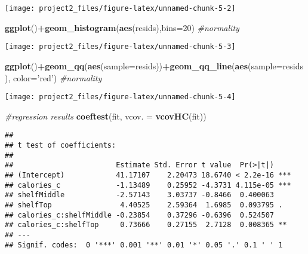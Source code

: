 \documentclass[]{article}
\newenvironment{Shaded}{\begin{snugshade}}{\end{snugshade}}
\newcommand{\CommentTok}[1]{\textcolor[rgb]{0.56,0.35,0.01}{\textit{#1}}}
\newcommand{\DataTypeTok}[1]{\textcolor[rgb]{0.13,0.29,0.53}{#1}}
\newcommand{\DecValTok}[1]{\textcolor[rgb]{0.00,0.00,0.81}{#1}}
\newcommand{\KeywordTok}[1]{\textcolor[rgb]{0.13,0.29,0.53}{\textbf{#1}}}
\newcommand{\NormalTok}[1]{#1}
\newcommand{\OperatorTok}[1]{\textcolor[rgb]{0.81,0.36,0.00}{\textbf{#1}}}
\newcommand{\StringTok}[1]{\textcolor[rgb]{0.31,0.60,0.02}{#1}}
\begin{document}
\begin{center}\texttt{[image: project2\_files/figure-latex/unnamed-chunk-5-2]} \end{center}

\begin{Shaded}
\begin{Highlighting}[]
\KeywordTok{ggplot}\NormalTok{()}\OperatorTok{+}\KeywordTok{geom_histogram}\NormalTok{(}\KeywordTok{aes}\NormalTok{(resids),}\DataTypeTok{bins=}\DecValTok{20}\NormalTok{) }\CommentTok{#normality}
\end{Highlighting}
\end{Shaded}

\begin{center}\texttt{[image: project2\_files/figure-latex/unnamed-chunk-5-3]} \end{center}

\begin{Shaded}
\begin{Highlighting}[]
\KeywordTok{ggplot}\NormalTok{()}\OperatorTok{+}\KeywordTok{geom_qq}\NormalTok{(}\KeywordTok{aes}\NormalTok{(}\DataTypeTok{sample=}\NormalTok{resids))}\OperatorTok{+}\KeywordTok{geom_qq_line}\NormalTok{(}\KeywordTok{aes}\NormalTok{(}\DataTypeTok{sample=}\NormalTok{resids), }\DataTypeTok{color=}\StringTok{'red'}\NormalTok{) }\CommentTok{#normality}
\end{Highlighting}
\end{Shaded}

\begin{center}\texttt{[image: project2\_files/figure-latex/unnamed-chunk-5-4]} \end{center}

\begin{Shaded}
\begin{Highlighting}[]
\CommentTok{#regression results}
\KeywordTok{coeftest}\NormalTok{(fit, }\DataTypeTok{vcov. =} \KeywordTok{vcovHC}\NormalTok{(fit))}
\end{Highlighting}
\end{Shaded}

\begin{verbatim}
## 
## t test of coefficients:
## 
##                        Estimate Std. Error t value  Pr(>|t|)    
## (Intercept)            41.17107    2.20473 18.6740 < 2.2e-16 ***
## calories_c             -1.13489    0.25952 -4.3731 4.115e-05 ***
## shelfMiddle            -2.57143    3.03737 -0.8466  0.400063    
## shelfTop                4.40525    2.59364  1.6985  0.093795 .  
## calories_c:shelfMiddle -0.23854    0.37296 -0.6396  0.524507    
## calories_c:shelfTop     0.73666    0.27155  2.7128  0.008365 ** 
## ---
## Signif. codes:  0 '***' 0.001 '**' 0.01 '*' 0.05 '.' 0.1 ' ' 1
\end{verbatim}
\end{document}
